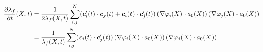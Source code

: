 \begin{align*}
	\d{\lambda_f}{t}(X,t) &= \frac{1}{2\lambda_f(X,t)} \suml{i,j}{N} (\vc'_i(t)\cdot \vc_j(t) + \vc_i(t)\cdot \vc'_j(t))\left(\dpi\cdot a_0(X)\right)(\dpj\cdot a_0(X))\\
		&= \frac{1}{\lambda_f(X,t)}\suml{i,j}{N} (\vc_i(t)\cdot \vc'_j(t))\left(\dpi\cdot a_0(X)\right)(\dpj\cdot a_0(X))
\end{align*}


